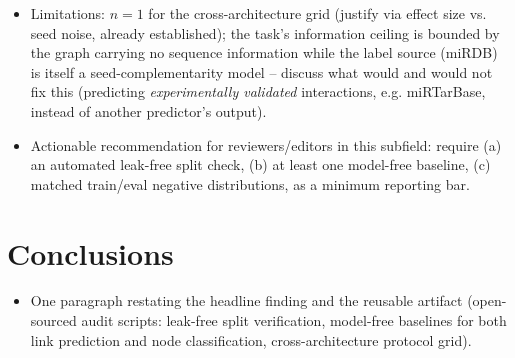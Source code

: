 \documentclass{bmcart}
\begin{document}
\begin{itemize}
\item [STAGE] Limitations: $n=1$ for the cross-architecture grid (justify via effect
size vs. seed noise, already established); the task's information ceiling is bounded by
the graph carrying no sequence information while the label source (miRDB) is itself a
seed-complementarity model -- discuss what would and would not fix this (predicting
\emph{experimentally validated} interactions, e.g. miRTarBase, instead of another
predictor's output).
\item [STAGE] Actionable recommendation for reviewers/editors in this subfield: require
(a) an automated leak-free split check, (b) at least one model-free baseline, (c)
matched train/eval negative distributions, as a minimum reporting bar.
\end{itemize}

\section*{Conclusions}
\begin{itemize}
\item [STAGE] One paragraph restating the headline finding and the reusable artifact
(open-sourced audit scripts: leak-free split verification, model-free baselines for
both link prediction and node classification, cross-architecture protocol grid).
\end{itemize}
\end{document}
